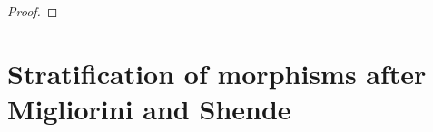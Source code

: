 \documentclass[a4paper,12pt,reqno]{amsart}
\theoremstyle{plain}
\theoremstyle{definition}
\theoremstyle{remark}
\begin{document}
\begin{proof}
%
%

\end{proof}









\section{Stratification of morphisms after Migliorini and Shende}
\end{document}
